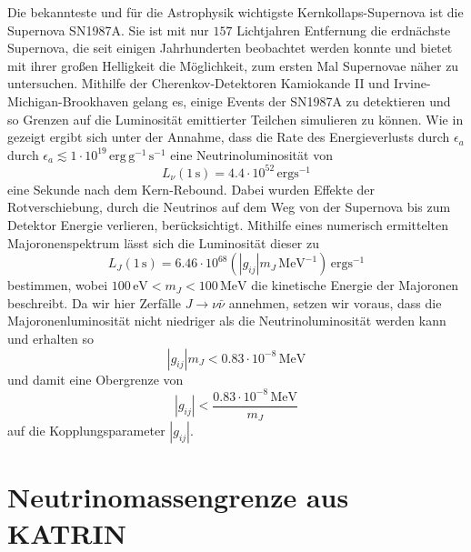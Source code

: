 Die bekannteste und für die Astrophysik wichtigste Kernkollaps-Supernova ist die Supernova SN1987A.
Sie ist mit nur $157$ Lichtjahren Entfernung die erdnächste Supernova, die seit einigen Jahrhunderten beobachtet werden konnte und bietet mit ihrer großen Helligkeit die Möglichkeit, zum ersten Mal Supernovae näher zu untersuchen.
Mithilfe der Cherenkov-Detektoren Kamiokande II und Irvine-Michigan-Brookhaven gelang es, einige Events der SN1987A zu detektieren und so Grenzen auf die Luminosität emittierter Teilchen simulieren zu können.
Wie in \cite{neutrinolumi} gezeigt ergibt sich unter der Annahme, dass die Rate des Energieverlusts durch $\epsilon_a$ durch $\epsilon_a \lesssim 1 \cdot 10^{19} \,\text{erg} \,\text{g}^{-1} \,\si{\second}^{-1}$ 
eine Neutrinoluminosität von
\begin{equation}
    L_\nu (1 \,\si{\second}) = \num{4.4} \cdot 10^{52} \,\text{erg} \si{\second}^{-1}
    \label{eq:neutrinolumi}
\end{equation}
eine Sekunde nach dem Kern-Rebound.
Dabei wurden Effekte der Rotverschiebung, durch die Neutrinos auf dem Weg von der Supernova bis zum Detektor Energie verlieren, berücksichtigt.
Mithilfe eines numerisch ermittelten Majoronenspektrum lässt sich die Luminosität dieser zu
\begin{equation}
    L_J (1 \,\si{\second}) = \num{6.46} \cdot 10^{68} \left(|g_{i j}| m_J \,\si{\mega\eV}^{-1} \right) \,\text{erg} \si{\second}^{-1}
\end{equation}
bestimmen, wobei $100 \,\si{\eV} < m_J < 100 \,\si{\mega\eV}$ die kinetische Energie der Majoronen beschreibt.
Da wir hier Zerfälle $J \rightarrow \nu \bar{\nu}$ annehmen, setzen wir voraus, dass die Majoronenluminosität nicht niedriger als die Neutrinoluminosität werden kann und erhalten so
\begin{equation*}
    |g_{i j}| m_J < \num{0.83} \cdot 10^{-8} \,\si{\mega\eV}
\end{equation*}
und damit eine Obergrenze von
\begin{equation}
    |g_{ij}| < \frac{\num{0.83} \cdot 10^{-8} \,\si{\mega\eV}}{m_J}
\end{equation}
auf die Kopplungsparameter $|g_{i j}|$.


\section{Neutrinomassengrenze aus KATRIN}
\label{subsec:KATRIN}

